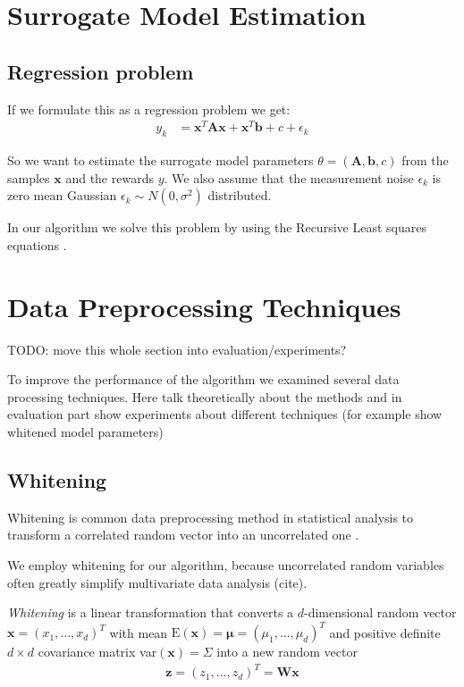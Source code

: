 \section{Surrogate Model Estimation}

\subsection{Regression problem}

If we formulate this as a regression problem we get:
\begin{align*}
  y_k &=  \mathbf{x}^T \mathbf{A} \mathbf{x} + \mathbf{x}^T \mathbf{b} + c + \epsilon_k
\end{align*}

So we want to estimate the surrogate model parameters $\theta = (\mathbf{A}, \mathbf{b}, c)$ from the samples $\mathbf{x}$
and the rewards $y$. We also assume that
the measurement noise $\epsilon_k$ is zero mean Gaussian $\epsilon_k \sim N(0, \sigma^2)$ distributed.

In our algorithm we solve this problem by using the Recursive Least squares equations .

\section{Data Preprocessing Techniques}
TODO: move this whole section into evaluation/experiments?

To improve the performance of the algorithm we examined several data processing techniques.
Here talk theoretically about the methods and in evaluation part
show experiments about different techniques (for example show whitened model
parameters)

\subsection{Whitening}
Whitening is common data preprocessing method in statistical analysis
to transform a correlated random vector into an uncorrelated one
\citet{kessy2018optimal}.

We employ whitening for our algorithm, because uncorrelated
random variables often greatly simplify  multivariate data analysis (cite).

\textit{Whitening} is a linear transformation that converts a $d$-dimensional
random vector $\mathbf{x} = (x_1,...,x_d)^T$ with mean
$\text{E}(\mathbf{x}) = \mathbf{\mu} = (\mu_1,...,\mu_d)^T$ and
positive definite $d \times d$ covariance matrix
var$(\mathbf{x}) = \Sigma$ into a new random vector
\begin{align}
  \label{whitening}
 \mathbf{z} = (z_1,...,z_d)^T = \mathbf{W}\mathbf{x}
\end{align}

